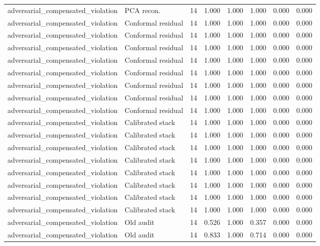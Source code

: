 {\begin{longtable}{llrrrrrr}
adversarial\_compensated\_violation & PCA recon. & 14 & 1.000 & 1.000 & 1.000 & 0.000 & 0.000 \\
adversarial\_compensated\_violation & Conformal residual & 14 & 1.000 & 1.000 & 1.000 & 0.000 & 0.000 \\
adversarial\_compensated\_violation & Conformal residual & 14 & 1.000 & 1.000 & 1.000 & 0.000 & 0.000 \\
adversarial\_compensated\_violation & Conformal residual & 14 & 1.000 & 1.000 & 1.000 & 0.000 & 0.000 \\
adversarial\_compensated\_violation & Conformal residual & 14 & 1.000 & 1.000 & 1.000 & 0.000 & 0.000 \\
adversarial\_compensated\_violation & Conformal residual & 14 & 1.000 & 1.000 & 1.000 & 0.000 & 0.000 \\
adversarial\_compensated\_violation & Conformal residual & 14 & 1.000 & 1.000 & 1.000 & 0.000 & 0.000 \\
adversarial\_compensated\_violation & Conformal residual & 14 & 1.000 & 1.000 & 1.000 & 0.000 & 0.000 \\
adversarial\_compensated\_violation & Conformal residual & 14 & 1.000 & 1.000 & 1.000 & 0.000 & 0.000 \\
adversarial\_compensated\_violation & Calibrated stack & 14 & 1.000 & 1.000 & 1.000 & 0.000 & 0.000 \\
adversarial\_compensated\_violation & Calibrated stack & 14 & 1.000 & 1.000 & 1.000 & 0.000 & 0.000 \\
adversarial\_compensated\_violation & Calibrated stack & 14 & 1.000 & 1.000 & 1.000 & 0.000 & 0.000 \\
adversarial\_compensated\_violation & Calibrated stack & 14 & 1.000 & 1.000 & 1.000 & 0.000 & 0.000 \\
adversarial\_compensated\_violation & Calibrated stack & 14 & 1.000 & 1.000 & 1.000 & 0.000 & 0.000 \\
adversarial\_compensated\_violation & Calibrated stack & 14 & 1.000 & 1.000 & 1.000 & 0.000 & 0.000 \\
adversarial\_compensated\_violation & Calibrated stack & 14 & 1.000 & 1.000 & 1.000 & 0.000 & 0.000 \\
adversarial\_compensated\_violation & Calibrated stack & 14 & 1.000 & 1.000 & 1.000 & 0.000 & 0.000 \\
adversarial\_compensated\_violation & Old audit & 14 & 0.526 & 1.000 & 0.357 & 0.000 & 0.000 \\
adversarial\_compensated\_violation & Old audit & 14 & 0.833 & 1.000 & 0.714 & 0.000 & 0.000 \\

\end{longtable}}
